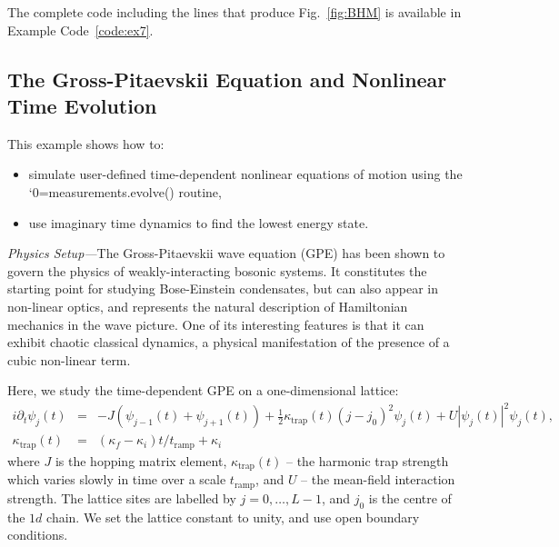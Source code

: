 \documentclass{SciPost}
\newcommand\0{\scalebox{-1}[1]{0}}
\let\svttfamily\ttfamily
\renewcommand\ttfamily{\svttfamily\catcode`0=\active }
\renewcommand\texttt{\bgroup\ttfamily\texttthelp}
\def\texttthelp#1{#1\egroup}
\newcommand{\BHLcode}{example7.py}
\begin{document}


The complete code including the lines that produce Fig.~\ref{fig:BHM} is available in Example Code~\ref{code:ex7}.

\subsection{The Gross-Pitaevskii Equation and Nonlinear Time Evolution}
\label{subsec:GP_dynamics}

This example shows how to:
\begin{itemize}
	\item simulate user-defined time-dependent nonlinear equations of motion using the \\ \texttt{measurements.evolve()} routine,
	\item use imaginary time dynamics to find the lowest energy state.
\end{itemize}

\noindent\emph{Physics Setup---}The Gross-Pitaevskii wave equation (GPE) has been shown to govern the physics of weakly-interacting bosonic systems. It constitutes the starting point for studying Bose-Einstein condensates, but can also appear in non-linear optics, and represents the natural description of Hamiltonian mechanics in the wave picture. One of its interesting features is that it can exhibit chaotic classical dynamics, a physical manifestation of the presence of a cubic non-linear term.

Here, we study the time-dependent GPE on a one-dimensional lattice:
\begin{eqnarray}
i\partial_t\psi_j(t) &=& -J\left( \psi_{j-1}(t) + \psi_{j+1}(t)\right) + \frac{1}{2}\kappa_\mathrm{trap}(t)(j-j_0)^2\psi_j(t) + U|\psi_j(t)|^2\psi_j(t), \nonumber \\
\kappa_\mathrm{trap}(t)&=&(\kappa_f-\kappa_i)t/t_\mathrm{ramp}+ \kappa_i
\label{eq:GPE}
\end{eqnarray}
where $J$ is the hopping matrix element, $\kappa_\mathrm{trap}(t)$ -- the harmonic trap strength which varies slowly in time over a scale $t_\mathrm{ramp}$, and $U$ -- the mean-field interaction strength. The lattice sites are labelled by $j=0,\dots,L-1$, and $j_0$ is the centre of the $1d$ chain. We set the lattice constant to unity, and use open boundary conditions.
\end{document}
